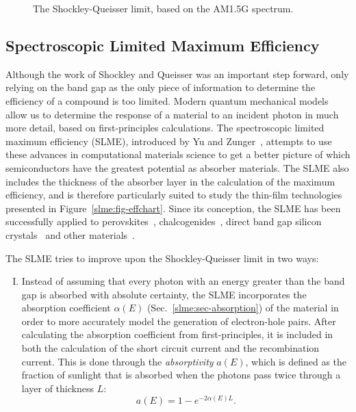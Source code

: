 \begin{refsection}
\begin{figure}[ht]  
\centering 

\caption{\label{slme:fig-SQlimit} The Shockley-Queisser limit, based on the 
AM1.5G spectrum.} 
\end{figure} 
 
\subsection{Spectroscopic Limited Maximum Efficiency} \label{slme:sec-SLME} 
 
Although the work of Shockley and Queisser was an important step forward, only 
relying on the band gap as the only piece of information to determine the 
efficiency of a compound is too limited. Modern quantum mechanical models 
allow us to determine the response of a material to an incident photon in much 
more detail, based on first-principles calculations. The 
spectroscopic limited maximum efficiency (SLME), introduced by Yu and 
Zunger~\cite{Yu2012}, attempts to use these advances in computational materials science 
to get a better picture of which semiconductors have the greatest potential as 
absorber materials. The SLME also includes the thickness of the absorber layer 
in the calculation of the maximum efficiency, and is therefore particularly 
suited to study the thin-film technologies presented in 
Figure~\ref{slme:fig-effchart}. Since its conception, the SLME has been 
successfully applied to perovskites~\cite{Yin2014, Yin2015, Yin2015b, 
Meng2016}, chalcogenides~\cite{Hong2016, Sarmadian2016}, direct band gap 
silicon crystals~\cite{Lee2014, Oh2015} and other materials~\cite{Yu2012b, 
Yokoyama2013, Heo2014, Huang2015}.  

The SLME tries to improve upon the Shockley-Queisser limit in two ways:  
\vspace{0.1in} 
\begin{enumerate}[I.] 
 
\item Instead of assuming that every photon with an energy greater than the 
band gap is absorbed with absolute certainty, the SLME incorporates the 
absorption coefficient $\alpha(E)$ (Sec.~\ref{slme:sec-absorption}) of the 
material in order to more accurately model the generation of electron-hole 
pairs. After calculating the absorption coefficient from first-principles, it is 
included in both the calculation of the short circuit current and the 
recombination current. This is done through the \textit{absorptivity} $a(E)$, 
which is defined as the fraction of sunlight that is absorbed when the photons 
pass twice through a layer of thickness $L$: 
\begin{equation} \label{slme:eq-absorptivity} 
a(E) = 1 - e^{-2 \alpha(E) L}. 
\end{equation} 
 

\end{enumerate}
\end{refsection}
